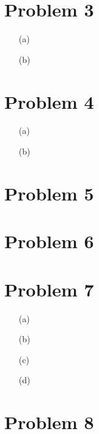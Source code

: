 \documentclass[12pt,a4paper]{article}
\begin{document}
\section*{Problem 3}    

\begin{enumerate}
    \item [(a)] 
        

    \item[(b)]
        

\end{enumerate}

\section*{Problem 4}

\begin{enumerate}
    \item [(a)] 
        
    \item[(b)]
       
    
\end{enumerate}

\section*{Problem 5}

\section*{Problem 6}

\section*{Problem 7}

\begin{enumerate}
    \item [(a)] 
        
    \item[(b)]
        
    \item[(c)]
        
    \item[(d)]
        

\end{enumerate}

\section*{Problem 8}
\end{document}
